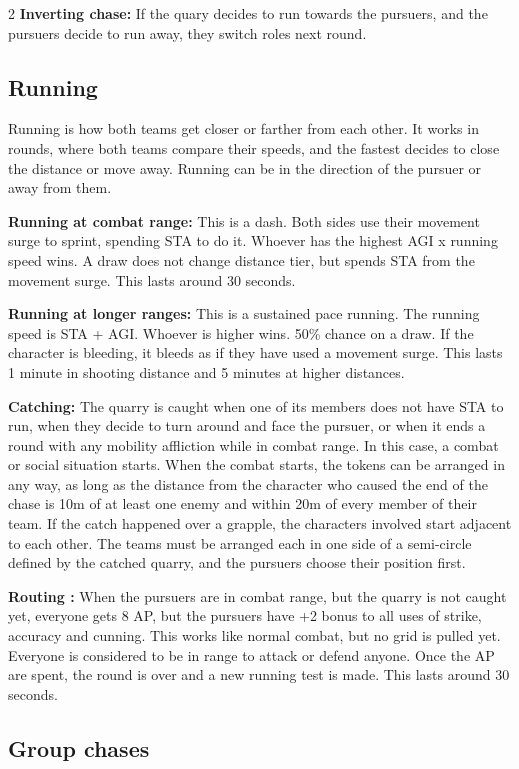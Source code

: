 \begin{multicols}{2}
\textbf{Inverting chase:} If the quary decides to run towards the pursuers, and the pursuers decide to run away, they switch roles next round.

\subsection{Running}

Running is how both teams get closer or farther from each other. It works in rounds, where both teams compare their speeds, and the fastest decides to close the distance or move away. Running can be in the direction of the pursuer or away from them. 

\textbf{Running at combat range:} This is a dash. Both sides use their movement surge to sprint, spending STA to do it. Whoever has the highest AGI x running speed wins. A draw does not change distance tier, but spends STA from the movement surge. This lasts around 30 seconds.

\textbf{Running at longer ranges:} This is a sustained pace running. The running speed is STA + AGI. Whoever is higher wins. 50\% chance on a draw. If the character is bleeding, it bleeds as if they have used a movement surge. This lasts 1 minute in shooting distance and 5 minutes at higher distances.

\textbf{Catching:} The quarry is caught when one of its members does not have STA to run, when they decide to turn around and face the pursuer, or when it ends a round with any mobility affliction while in combat range. In this case, a combat or social situation starts. When the combat starts, the tokens can be arranged in any way, as long as the distance from the character who caused the end of the chase is 10m of at least one enemy and within 20m of every member of their team. If the catch happened over a grapple, the characters involved start adjacent to each other. The teams must be arranged each in one side of a semi-circle defined by the catched quarry, and the pursuers choose their position first.

\textbf{ Routing :} When the pursuers are in combat range, but the quarry is not caught yet, everyone gets 8 AP, but the pursuers have +2 bonus to all uses of strike, accuracy and cunning. This works like normal combat, but no grid is pulled yet. Everyone is considered to be in range to attack or defend anyone. Once the AP are spent, the round is over and a new running test is made. This lasts around 30 seconds.

\subsection{Group chases}


\end{multicols}
